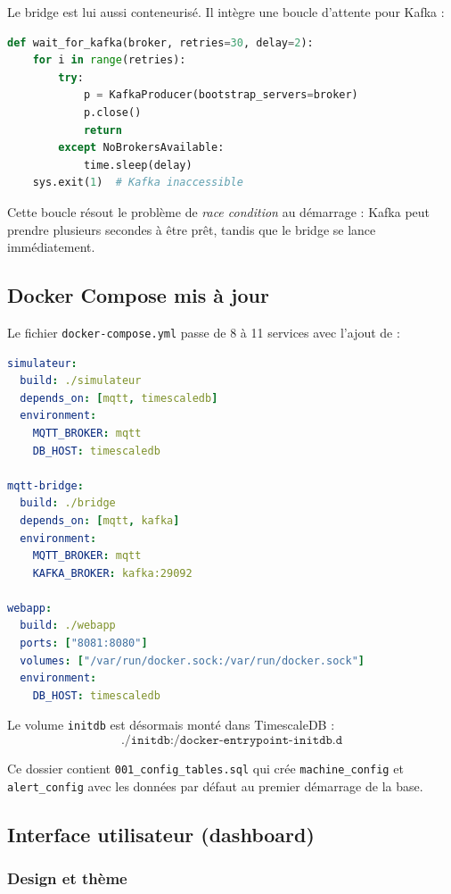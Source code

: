 \documentclass[12pt,a4paper]{article}
\begin{document}
Le bridge est lui aussi conteneurisé. Il intègre une boucle d'attente pour Kafka :

\begin{lstlisting}[language=Python,caption={Boucle d'attente pour Kafka dans mqtt\_to\_kafka.py}]
def wait_for_kafka(broker, retries=30, delay=2):
    for i in range(retries):
        try:
            p = KafkaProducer(bootstrap_servers=broker)
            p.close()
            return
        except NoBrokersAvailable:
            time.sleep(delay)
    sys.exit(1)  # Kafka inaccessible
\end{lstlisting}

Cette boucle résout le problème de \textit{race condition} au démarrage : Kafka peut prendre plusieurs secondes à être prêt, tandis que le bridge se lance immédiatement.

\subsection{Docker Compose mis à jour}

Le fichier \texttt{docker-compose.yml} passe de 8 à 11 services avec l'ajout de :

\begin{lstlisting}[language=yaml,caption={Nouveaux services dans docker-compose.yml}]
simulateur:
  build: ./simulateur
  depends_on: [mqtt, timescaledb]
  environment:
    MQTT_BROKER: mqtt
    DB_HOST: timescaledb

mqtt-bridge:
  build: ./bridge
  depends_on: [mqtt, kafka]
  environment:
    MQTT_BROKER: mqtt
    KAFKA_BROKER: kafka:29092

webapp:
  build: ./webapp
  ports: ["8081:8080"]
  volumes: ["/var/run/docker.sock:/var/run/docker.sock"]
  environment:
    DB_HOST: timescaledb
\end{lstlisting}

Le volume \texttt{initdb} est désormais monté dans TimescaleDB :
\[
\texttt{./initdb:/docker-entrypoint-initdb.d}
\]

Ce dossier contient \texttt{001\_config\_tables.sql} qui crée \texttt{machine\_config} et \texttt{alert\_config} avec les données par défaut au premier démarrage de la base.

\subsection{Interface utilisateur (dashboard)}

\subsubsection{Design et thème}
\end{document}
